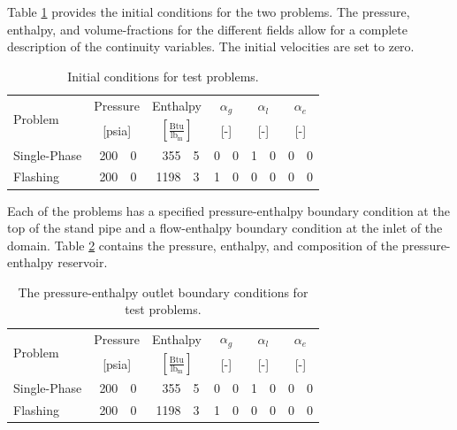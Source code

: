 Table \ref{tab:ic} provides the initial conditions for the two problems.
The pressure, enthalpy, and volume-fractions for the different fields allow for a complete description of the continuity variables.
The initial velocities are set to zero.

\begin{table}[ht]
\centering
\begin{tabular}{@{}lr@{.}lr@{.}lr@{.}lr@{.}lr@{.}l@{}} \toprule
\multirow{2}{*}{Problem} & \multicolumn{2}{c}{Pressure} & \multicolumn{2}{c}{Enthalpy}             & \multicolumn{2}{c}{$\alpha_g$} & \multicolumn{2}{c}{$\alpha_l$} & \multicolumn{2}{c}{$\alpha_e$} \\ 
                         & \multicolumn{2}{c}{[psia]} & \multicolumn{2}{c}{$[\frac{\text{Btu}}{\text{lb}_{\text{m}}}]$} & \multicolumn{2}{c}{[-]}      & \multicolumn{2}{c}{[-]}      & \multicolumn{2}{c}{[-]}      \\ \midrule
Single-Phase             &  200&0                       &  355&5                                   & 0&0                            & 1&0                            & 0&0 \\
Flashing                 &  200&0                       & 1198&3                                   & 1&0                            & 0&0                            & 0&0 \\ \bottomrule  
\end{tabular}
\caption{Initial conditions for test problems.}
\label{tab:ic}
\end{table}

Each of the problems has a specified pressure-enthalpy boundary condition at the top of the stand pipe and a flow-enthalpy boundary condition at the inlet of the domain.
Table \ref{tab:bc_pe} contains the pressure, enthalpy, and composition of the pressure-enthalpy reservoir. 

\begin{table}[ht]
\centering
\begin{tabular}{@{}lr@{.}lr@{.}lr@{.}lr@{.}lr@{.}l@{}} \toprule
\multirow{2}{*}{Problem} & \multicolumn{2}{c}{Pressure} & \multicolumn{2}{c}{Enthalpy}             & \multicolumn{2}{c}{$\alpha_g$} & \multicolumn{2}{c}{$\alpha_l$} & \multicolumn{2}{c}{$\alpha_e$} \\ 
                         & \multicolumn{2}{c}{[psia]} & \multicolumn{2}{c}{$[\frac{\text{Btu}}{\text{lb}_{\text{m}}}]$} & \multicolumn{2}{c}{[-]}      & \multicolumn{2}{c}{[-]}      & \multicolumn{2}{c}{[-]}      \\ \midrule
Single-Phase             &  200&0                       &  355&5                                   & 0&0                            & 1&0                            & 0&0 \\
Flashing                 &  200&0                       & 1198&3                                   & 1&0                            & 0&0                            & 0&0 \\ \bottomrule  
\end{tabular}
\caption{The pressure-enthalpy outlet boundary conditions for test problems.}
\label{tab:bc_pe}
\end{table}

